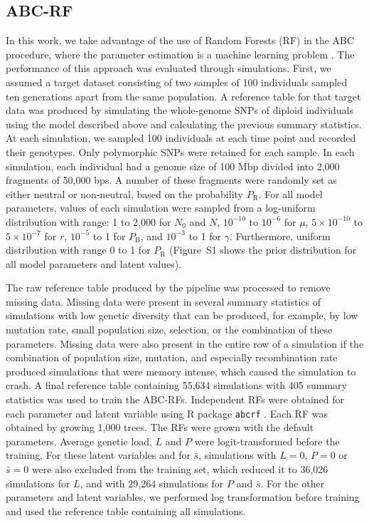 \documentclass[a4paper, 12pt]{article}
\begin{document}
\subsection*{ABC-RF}

In this work, we take advantage of the use of Random Forests (RF) in the ABC procedure, where the parameter estimation is a machine learning problem \citep{Pudlo:2016il, Raynal:2019jj}. The performance of this approach was evaluated through simulations. First, we assumed a target dataset consisting of two samples of 100 individuals sampled ten generations apart from the same population. A reference table for that target data was produced by simulating the whole-genome SNPs of diploid individuals using the model described above and calculating the previous summary statistics. At each simulation, we sampled 100 individuals at each time point and recorded their genotypes. Only polymorphic SNPs were retained for each sample. In each simulation, each individual had a genome size of 100 Mbp divided into 2,000 fragments of 50,000 bps. A number of these fragments were randomly set as either neutral or non-neutral, based on the probability $P_{\mathrm{R}}$. For all model parameters, values of each simulation were sampled from a log-uniform distribution with range: 1 to 2,000 for $N_\mathrm{0}$ and $N$, $10^{-10}$ to $10^{-6}$ for $\mu$, $5\times 10^{-10}$ to $5\times 10^{-7}$ for $r$, $10^{-5}$ to 1 for $P_{\mathrm{B}}$, and $10^{-3}$ to 1 for $\gamma$. Furthermore, uniform distribution with range 0 to 1 for $P_{\mathrm{R}}$ (Figure~S1 shows the prior distribution for all model parameters and latent values).

The raw reference table produced by the pipeline was processed to remove missing data. Missing data were present in several summary statistics of simulations with low genetic diversity that can be produced, for example, by low mutation rate, small population size, selection, or the combination of these parameters. Missing data were also present in the entire row of a simulation if the combination of population size, mutation, and especially recombination rate produced simulations that were memory intense, which caused the simulation to crash. A final reference table containing 55,634 simulations with 405 summary statistics was used to train the ABC-RFs. Independent RFs were obtained for each parameter and latent variable using R package \texttt{abcrf} \citep{Pudlo:2016il, Raynal:2019jj}. Each RF was obtained by growing 1,000 trees. The RFs were grown with the default parameters. Average genetic load, $L$ and $P$ were logit-transformed before the training. For these latent variables and for $\bar{s}$, simulations with $L=0$, $P=0$ or $\bar{s} = 0$ were also excluded from the training set, which reduced it to 36,026 simulations for $L$, and with 29,264 simulations for $P$ and $\bar{s}$. For the other parameters and latent variables, we performed log transformation before training and used the reference table containing all simulations.
\end{document}

